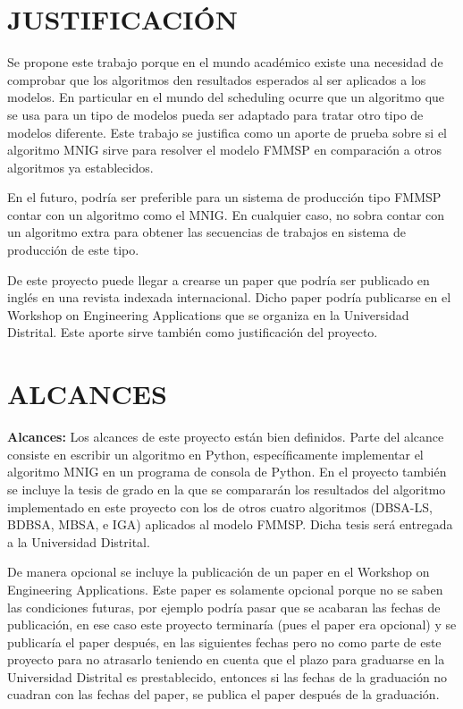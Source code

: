 \documentclass{article}
\begin{document}
\section{JUSTIFICACIÓN}

Se propone este trabajo porque en el mundo académico existe una necesidad de comprobar que los algoritmos den resultados esperados al ser aplicados a los modelos. En particular en el mundo del scheduling ocurre que un algoritmo que se usa para un tipo de modelos pueda ser adaptado para tratar otro tipo de modelos diferente. Este trabajo se justifica como un aporte de prueba sobre si el algoritmo MNIG sirve para resolver el modelo FMMSP en comparación a otros algoritmos ya establecidos.

\vspace{\baselineskip}
En el futuro, podría ser preferible para un sistema de producción tipo \linebreak FMMSP contar con un algoritmo como el MNIG. En cualquier caso, no sobra contar con un algoritmo extra para obtener las secuencias de trabajos en sistema de producción de este tipo.

\vspace{\baselineskip}
De este proyecto puede llegar a crearse un paper que podría ser publicado en inglés en una revista indexada internacional. Dicho paper podría publicarse en el Workshop on Engineering Applications que se organiza en la Universidad Distrital. Este aporte sirve también como justificación del proyecto.

\section{ALCANCES}

\textbf{Alcances:} Los alcances de este proyecto están bien definidos. Parte del alcance consiste en escribir un algoritmo en Python, específicamente implementar el algoritmo MNIG en un programa de consola de Python. En el proyecto también se incluye la tesis de grado en la que se compararán los resultados del algoritmo implementado en este proyecto con los de otros cuatro algoritmos (DBSA-LS, BDBSA, MBSA, e IGA) aplicados al modelo FMMSP. Dicha tesis será entregada a la Universidad Distrital.

\vspace{\baselineskip}
De manera opcional se incluye la publicación de un paper en el Workshop on Engineering Applications. Este paper es solamente opcional porque no se saben las condiciones futuras, por ejemplo podría pasar que se acabaran las fechas de publicación, en ese caso este proyecto terminaría (pues el paper era opcional) y se publicaría el paper después, en las siguientes fechas pero no como parte de este proyecto para no atrasarlo teniendo en cuenta que el plazo para graduarse en la Universidad Distrital es prestablecido, entonces si las fechas de la graduación no cuadran con las fechas del paper, se publica el paper después de la graduación.
\end{document}
